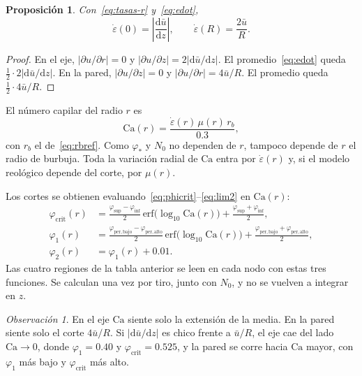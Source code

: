 \documentclass[11pt,a4paper]{article}
\theoremstyle{plain}
\newtheorem{proposicion}{Proposición}
\theoremstyle{definition}
\theoremstyle{remark}
\newtheorem*{obs}{Observación}
\begin{document}
\begin{proposicion}
\label{prop:extremos}
Con~\eqref{eq:tasas-r} y~\eqref{eq:edot},
\begin{equation}
\dot\varepsilon(0)
=
\left|\frac{\mathrm{d}\bar u}{\mathrm{d}z}\right|,
\qquad
\dot\varepsilon(R)
=
\frac{2\bar u}{R}.
\label{eq:extremos}
\end{equation}
\end{proposicion}

\begin{proof}
En el eje, \(|\partial u/\partial r|=0\) y
\(|\partial u/\partial z|=2|\mathrm{d}\bar u/\mathrm{d}z|\).
El promedio~\eqref{eq:edot} queda
\(\tfrac12\cdot 2|\mathrm{d}\bar u/\mathrm{d}z|\).
En la pared, \(|\partial u/\partial z|=0\) y
\(|\partial u/\partial r|=4\bar u/R\).
El promedio queda \(\tfrac12\cdot 4\bar u/R\).
\end{proof}

El número capilar del radio \(r\) es
\begin{equation}
\mathrm{Ca}(r)
=
\frac{\dot\varepsilon(r)\,\mu(r)\,r_b}{0.3},
\label{eq:Ca-r}
\end{equation}
con \(r_b\) el de~\eqref{eq:rbref}. Como \(\varphi_\ast\) y \(N_0\) no
dependen de \(r\), tampoco depende de \(r\) el radio de burbuja. Toda la
variación radial de \(\mathrm{Ca}\) entra por \(\dot\varepsilon(r)\) y, si
el modelo reológico depende del corte, por \(\mu(r)\).

Los cortes se obtienen evaluando~\eqref{eq:phicrit}--\eqref{eq:lim2} en
\(\mathrm{Ca}(r)\):
\begin{align}
\varphi_{\mathrm{crit}}(r)
&=
\frac{\varphi_{\sup}-\varphi_{\inf}}{2}
\,\mathrm{erf}\bigl(\log_{10}\mathrm{Ca}(r)\bigr)
+
\frac{\varphi_{\sup}+\varphi_{\inf}}{2},
\label{eq:phicrit-r}\\
\varphi_1(r)
&=
\frac{\varphi_{\mathrm{per,bajo}}-\varphi_{\mathrm{per,alto}}}{2}
\,\mathrm{erf}\bigl(\log_{10}\mathrm{Ca}(r)\bigr)
+
\frac{\varphi_{\mathrm{per,bajo}}+\varphi_{\mathrm{per,alto}}}{2},
\label{eq:lim1-r}\\
\varphi_2(r)
&=
\varphi_1(r)+0.01.
\label{eq:lim2-r}
\end{align}
Las cuatro regiones de la tabla anterior se leen en cada nodo con estas
tres funciones. Se calculan una vez por tiro, junto con \(N_0\), y no se
vuelven a integrar en \(z\).

\begin{obs}
En el eje \(\mathrm{Ca}\) siente solo la extensión de la media. En la
pared siente solo el corte \(4\bar u/R\). Si \(|\mathrm{d}\bar u/\mathrm{d}z|\)
es chico frente a \(\bar u/R\), el eje cae del lado
\(\mathrm{Ca}\to 0\), donde \(\varphi_1=0.40\) y
\(\varphi_{\mathrm{crit}}=0.525\), y la pared se corre hacia
\(\mathrm{Ca}\) mayor, con \(\varphi_1\) más bajo y
\(\varphi_{\mathrm{crit}}\) más alto.
\end{obs}
\end{document}
